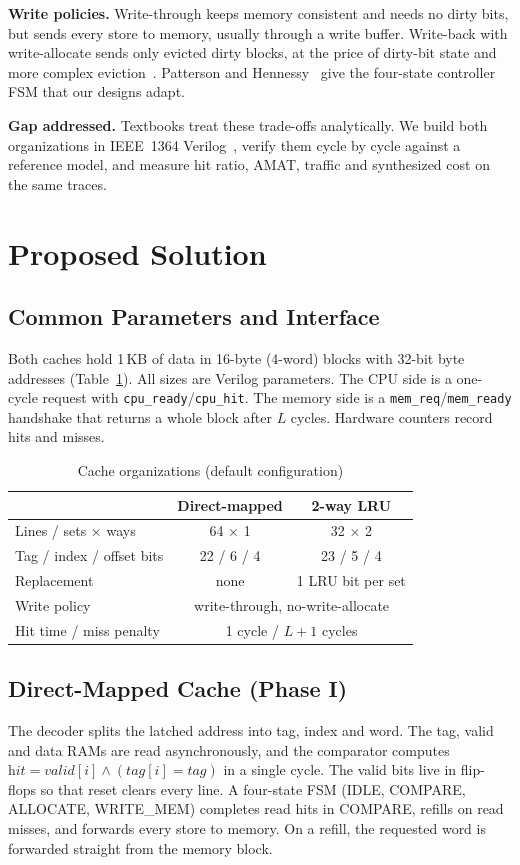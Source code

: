 \documentclass[conference]{IEEEtran}
\begin{document}
\textbf{Write policies.} Write-through keeps memory consistent and needs no dirty bits, but sends every store to memory, usually through a write buffer. Write-back with write-allocate sends only evicted dirty blocks, at the price of dirty-bit state and more complex eviction~\cite{hp_caqa}. Patterson and Hennessy~\cite{hp_coa} give the four-state controller FSM that our designs adapt.

\textbf{Gap addressed.} Textbooks treat these trade-offs analytically. We build both organizations in IEEE~1364 Verilog~\cite{verilog2005}, verify them cycle by cycle against a reference model, and measure hit ratio, AMAT, traffic and synthesized cost on the same traces.

\section{Proposed Solution}
\subsection{Common Parameters and Interface}
Both caches hold 1\,KB of data in 16-byte (4-word) blocks with 32-bit byte addresses (Table~\ref{tab:params}). All sizes are Verilog parameters. The CPU side is a one-cycle request with \texttt{cpu\_ready}/\texttt{cpu\_hit}. The memory side is a \texttt{mem\_req}/\texttt{mem\_ready} handshake that returns a whole block after $L$ cycles. Hardware counters record hits and misses.

\begin{table}[h]\centering
\caption{Cache organizations (default configuration)}\label{tab:params}
\begin{tabular}{@{}lcc@{}}\toprule
 & Direct-mapped & 2-way LRU \\ \midrule
Lines / sets $\times$ ways & 64 $\times$ 1 & 32 $\times$ 2 \\
Tag / index / offset bits & 22 / 6 / 4 & 23 / 5 / 4 \\
Replacement & none & 1 LRU bit per set \\
Write policy & \multicolumn{2}{c}{write-through, no-write-allocate} \\
Hit time / miss penalty & \multicolumn{2}{c}{1 cycle / $L+1$ cycles} \\ \bottomrule
\end{tabular}\end{table}

\subsection{Direct-Mapped Cache (Phase I)}
The decoder splits the latched address into tag, index and word. The tag, valid and data RAMs are read asynchronously, and the comparator computes $\textit{hit}=\textit{valid}[i]\wedge(\textit{tag}[i]=\textit{tag})$ in a single cycle. The valid bits live in flip-flops so that reset clears every line. A four-state FSM (IDLE, COMPARE, ALLOCATE, WRITE\_MEM) completes read hits in COMPARE, refills on read misses, and forwards every store to memory. On a refill, the requested word is forwarded straight from the memory block.
\end{document}
